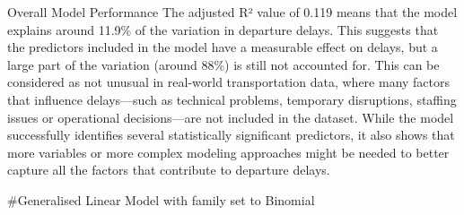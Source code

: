 \documentclass[
]{article}
\begin{document}
Overall Model Performance The adjusted R² value of 0.119 means that the
model explains around 11.9\% of the variation in departure delays. This
suggests that the predictors included in the model have a measurable
effect on delays, but a large part of the variation (around 88\%) is
still not accounted for. This can be considered as not unusual in
real-world transportation data, where many factors that influence
delays---such as technical problems, temporary disruptions, staffing
issues or operational decisions---are not included in the dataset. While
the model successfully identifies several statistically significant
predictors, it also shows that more variables or more complex modeling
approaches might be needed to better capture all the factors that
contribute to departure delays.

\#Generalised Linear Model with family set to Binomial
\end{document}
